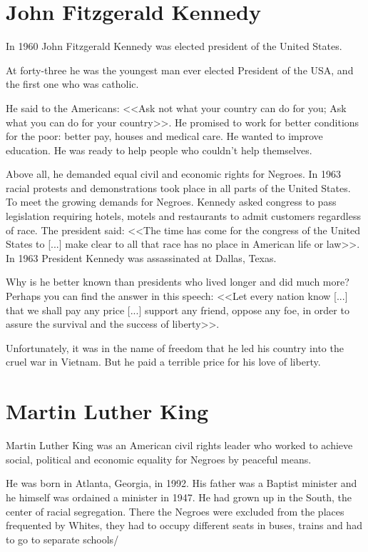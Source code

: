 \section{John Fitzgerald Kennedy}
In 1960 John Fitzgerald Kennedy was elected president of the United States.

At forty-three he was the youngest man ever elected President of the USA, and the first one who was catholic.

He said to the Americans: <<Ask not what your country can do for you; Ask what you can do for your country>>. He promised to work for better conditions for the poor: better pay, houses and medical care. He wanted to improve education. He was ready to help people who couldn't help themselves.

Above all, he demanded equal civil and economic rights for Negroes. In 1963 racial protests and demonstrations took place in all parts of the United States. To meet the growing demands for Negroes. Kennedy asked congress to pass legislation requiring hotels, motels and restaurants to admit customers regardless of race. The president said: <<The time has come for the congress of the United States to [...] make clear to all that race has no place in American life or law>>. In 1963 President Kennedy was assassinated at Dallas, Texas.

Why is he better known than presidents who lived longer and did much more? Perhaps you can find the answer in this speech: <<Let every nation know [...] that we shall pay any price [...] support any friend, oppose any foe, in order to assure the survival and the success of liberty>>.

Unfortunately, it was in the name of freedom that he led his country into the cruel war in Vietnam. But he paid a terrible price for his love of liberty.

\section{Martin Luther King}
Martin Luther King was an American civil rights leader who worked to achieve social, political and economic equality for Negroes by peaceful means.

He was born in Atlanta, Georgia, in 1992. His father was a Baptist minister and he himself was ordained a minister in 1947. He had grown up in the South, the center of racial segregation. There the Negroes were excluded from the places frequented by Whites, they had to occupy different seats in buses, trains and had to go to separate schools/

